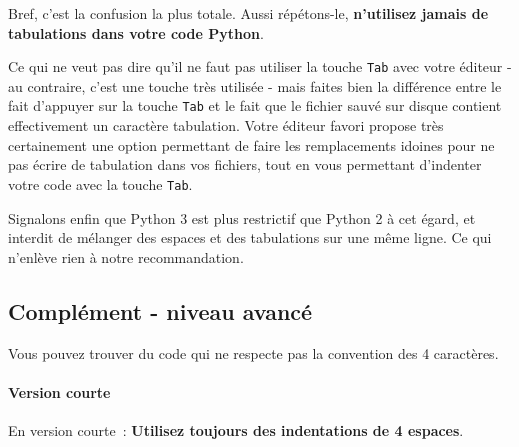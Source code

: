     \begin{Shaded}
\begin{Highlighting}[]
  
          
\OperatorTok{=} 
            \NormalTok{(}\NormalTok{)}
        \NormalTok{:}
\OperatorTok{=} 
            \NormalTok{(}\NormalTok{)}
\end{Highlighting}
\end{Shaded}

    Bref, c'est la confusion la plus totale. Aussi répétons-le,
\textbf{n'utilisez jamais de tabulations dans votre code Python}.

    Ce qui ne veut pas dire qu'il ne faut pas utiliser la touche
\texttt{Tab} avec votre éditeur - au contraire, c'est une touche très
utilisée - mais faites bien la différence entre le fait d'appuyer sur la
touche \texttt{Tab} et le fait que le fichier sauvé sur disque contient
effectivement un caractère tabulation. Votre éditeur favori propose très
certainement une option permettant de faire les remplacements idoines
pour ne pas écrire de tabulation dans vos fichiers, tout en vous
permettant d'indenter votre code avec la touche \texttt{Tab}.

    Signalons enfin que Python 3 est plus restrictif que Python 2 à cet
égard, et interdit de mélanger des espaces et des tabulations sur une
même ligne. Ce qui n'enlève rien à notre recommandation.

    \hypertarget{compluxe9ment---niveau-avancuxe9}{%
\subsection{Complément - niveau
avancé}\label{compluxe9ment---niveau-avancuxe9}}

    Vous pouvez trouver du code qui ne respecte pas la convention des 4
caractères.

    \hypertarget{version-courte}{%
\paragraph{Version courte}\label{version-courte}}

    En version courte~: \textbf{Utilisez toujours des indentations de 4
espaces}.

